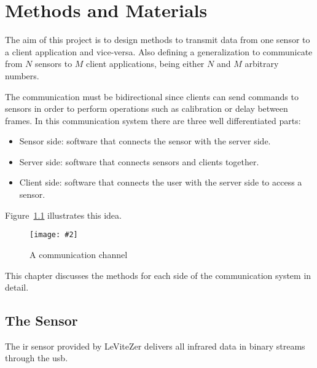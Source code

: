 \documentclass[hidelinks,11pt,a4paper,oneside,article]{memoir}
\newcommand{\putimage}[3][10] %
{
\begin{figure}[h]
	\centering
	\captionsetup{justification=centering}
	\texttt{[image: \#2]}
	\caption{#3}
	\label{fig:#2}
\end{figure}
}
\begin{document}
\clearpage\chapter{Methods and Materials}\label{sec:methods-and-materials}

The aim of this project is to design methods to transmit data from one sensor to a client application and vice-versa. Also defining a generalization to communicate from $N$ sensors to $M$ client applications, being either $N$ and $M$ arbitrary numbers.

The communication must be bidirectional since clients can send commands to sensors in order to perform operations such as calibration or delay between frames. In this communication system there are three well differentiated parts:
\begin{itemize}
    \item Sensor side: software that connects the sensor with the server side.
    \item Server side: software that connects sensors and clients together.
    \item Client side: software that connects the user with the server side to access a sensor.
\end{itemize}

Figure~\ref{fig:communication-channel} illustrates this idea.

\putimage{communication-channel}{A communication channel}

This chapter discusses the methods for each side of the communication system in detail.


\section{The Sensor}
The \gls{ir} sensor provided by LeViteZer delivers all infrared data in binary streams through the \gls{usb}.
\end{document}
